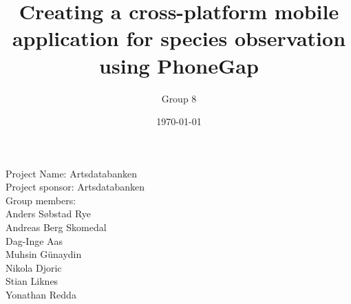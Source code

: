 \documentclass[a4paper]{article}
\begin{document}
  \title{Creating a cross-platform mobile application for species observation using PhoneGap}
	\author{Group 8}
	\date{\today}
	\maketitle
	\thispagestyle{empty}
	\pagebreak

	\pagestyle{empty}
	\begin{center}
		Project Name: Artsdatabanken \\
		Project sponsor: Artsdatabanken \\
    Group members: \\
    Anders Søbstad Rye\\
    Andreas Berg Skomedal\\
    Dag-Inge Aas\\
    Muhsin Günaydin\\
    Nikola Djoric\\
    Stian Liknes\\
    Yonathan Redda
	\end{center}
	\newpage

	\tableofcontents
	\listoffigures
	\listoftables

	\newpage
	\pagestyle{plain}
	\setcounter{page}{1}
  

  \newpage
	

  \newpage
  

	\newpage
	

	\newpage
	

	\newpage

	

	\newpage
	

	\newpage
	

	\newpage
	

\newpage

\newpage
%

\clearpage
	\nocite{*}
	
	
\end{document}
